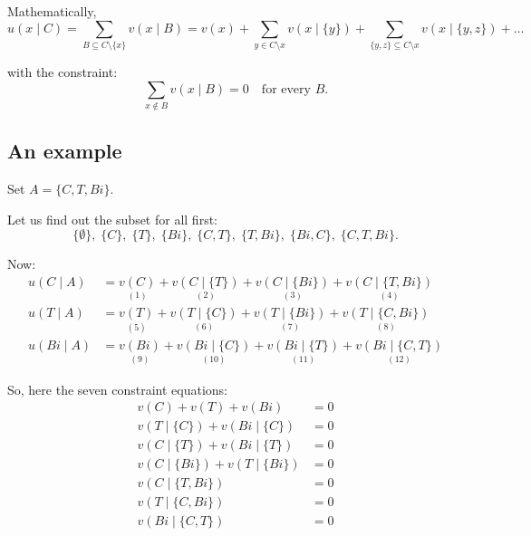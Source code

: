 Mathematically,
\begin{equation*}
    u(x \mid C) = \sum_{B \subseteq C \setminus \{x\}} v(x \mid B)
    = v(x) + \sum_{y \in C \setminus x} v(x \mid \{y\})
    + \sum_{\{y, z\} \subseteq C \setminus x} v(x \mid \{y, z\}) + \dots
\end{equation*}

with the constraint:
\begin{equation*}
    \sum_{x \notin B} v(x \mid B) = 0 \quad \text{for every } B.
\end{equation*}

\subsection*{An example}

Set $A = \{C, T, Bi\}$.

Let us find out the subset for all first:
\begin{equation*}
    \{\emptyset\}, \; \{C\}, \; \{T\}, \; \{Bi\}, \; \{C, T\}, \;
    \{T, Bi\}, \; \{Bi, C\}, \; \{C, T, Bi\}.
\end{equation*}

Now:
\begin{align*}
    u(C \mid A) &= \underset{(1)}{v(C)} + \underset{(2)}{v(C \mid \{T\})} + \underset{(3)}{v(C \mid \{Bi\})} + \underset{(4)}{v(C \mid \{T, Bi\})} \\[1mm]
    u(T \mid A) &= \underset{(5)}{v(T)} + \underset{(6)}{v(T \mid \{C\})} + \underset{(7)}{v(T \mid \{Bi\})} + \underset{(8)}{v(T \mid \{C, Bi\})} \\[1mm]
    u(Bi \mid A) &= \underset{(9)}{v(Bi)} + \underset{(10)}{v(Bi \mid \{C\})} + \underset{(11)}{v(Bi \mid \{T\})} + \underset{(12)}{v(Bi \mid \{C, T\})}
\end{align*}

So, here the seven constraint equations:
\begin{align}
    v(C) + v(T) + v(Bi) &= 0 \\
    v(T \mid \{C\}) + v(Bi \mid \{C\}) &= 0 \\
    v(C \mid \{T\}) + v(Bi \mid \{T\}) &= 0 \\
    v(C \mid \{Bi\}) + v(T \mid \{Bi\}) &= 0 \\
    v(C \mid \{T, Bi\}) &= 0 \\
    v(T \mid \{C, Bi\}) &= 0 \\
    v(Bi \mid \{C, T\}) &= 0
\end{align}

